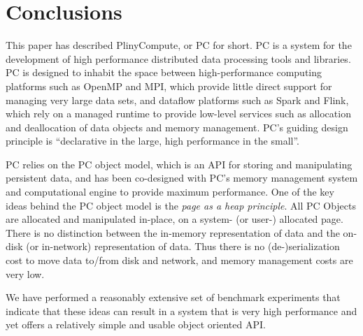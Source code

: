 
\section{Conclusions}

This paper has described PlinyCompute, or PC for short.  PC is a system for the development of high performance
distributed data processing tools and libraries.  PC is designed to inhabit the space between
high-performance computing platforms such as OpenMP and MPI, which provide little direct support
for managing very large data sets, and dataflow platforms such as Spark and Flink, which rely on 
a managed runtime to provide low-level services such as allocation and deallocation of data objects and memory management.
PC's guiding design principle is ``declarative in the large,
high performance in the small''.


PC relies on the PC object model, which is an
API for storing and manipulating persistent data, and has been co-designed with PC's memory management
system and computational engine to provide maximum performance.
One of the key ideas behind the PC object model is the \emph{page as a heap principle}. All PC
Objects are allocated and manipulated in-place, on a system- (or user-) allocated page. There is no distinction
between the in-memory representation of data and the on-disk (or in-network) representation of data.
Thus there is no (de-)serialization cost to move data to/from disk and network, and memory management
costs are very low.

We have performed a reasonably extensive set of benchmark experiments that indicate that these ideas can result in 
a system that is very high performance and yet offers a relatively
simple and usable object oriented API. 


